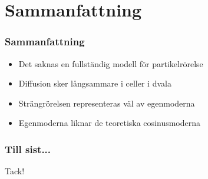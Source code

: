 \documentclass[swedish]{beamer}
\begin{document}
\section{Sammanfattning}
\begin{frame}
\frametitle{Sammanfattning}

\begin{itemize}[label={$\bullet$}]
    
 \item{Det saknas en fullständig modell för partikelrörelse}
\\[8mm]
 \item{Diffusion sker långsammare i celler i dvala}
\\[8mm]
 \item{Strängrörelsen representeras väl av egenmoderna}
\\[8mm]
\item{Egenmoderna liknar de teoretiska cosinusmoderna}

\end{itemize}


\end{frame}

\begin{frame}
\frametitle{Till sist...}
    \begin{center}
    \huge Tack! 
    \end{center}
\end{frame}
\end{document}
